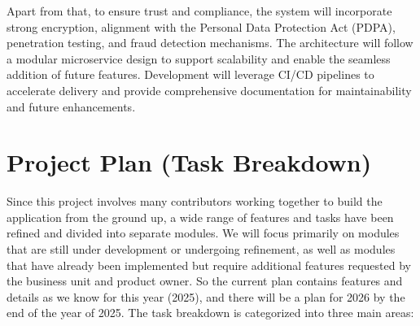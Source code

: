 \documentclass[12pt,oneside,openright,a4paper]{cpe-english-project}
\begin{document}
Apart from that, to ensure trust and compliance, the system will
incorporate strong encryption, alignment with the Personal Data
Protection Act (PDPA), penetration testing, and fraud detection
mechanisms. The architecture will follow a modular microservice design
to support scalability and enable the seamless addition of future
features. Development will leverage CI/CD pipelines to accelerate
delivery and provide comprehensive documentation for maintainability and
future enhancements.

\section{Project Plan (Task Breakdown)}

Since this project involves many contributors working together to build
the application from the ground up, a wide range of features and tasks
have been refined and divided into separate modules. We will focus
primarily on modules that are still under development or undergoing
refinement, as well as modules that have already been implemented but
require additional features requested by the business unit and product
owner. So the current plan contains features and details as we know for
this year (2025), and there will be a plan for 2026 by the end of the
year of 2025. The task breakdown is categorized into three main areas:
\end{document}

